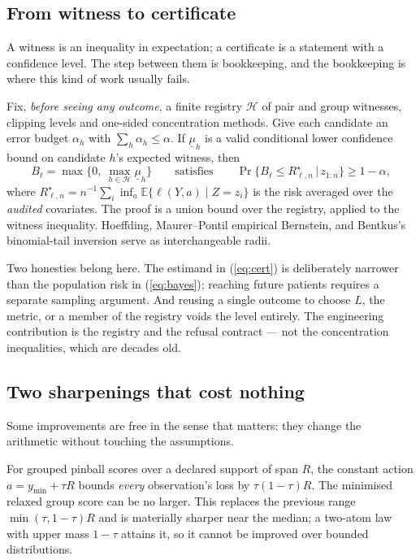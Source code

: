 \documentclass[11pt,a4paper]{article}
\newcommand{\risk}{R^{\star}}
\begin{document}
\subsection{From witness to certificate}

A witness is an inequality in expectation; a certificate is a statement with a confidence level. The step between them is bookkeeping, and the bookkeeping is where this kind of work usually fails.

Fix, \emph{before seeing any outcome}, a finite registry $\mathcal H$ of pair and group witnesses, clipping levels and one-sided concentration methods. Give each candidate an error budget $\alpha_h$ with $\sum_h\alpha_h\leq\alpha$. If $\underline\mu_h$ is a valid conditional lower confidence bound on candidate $h$'s expected witness, then
\begin{equation}
B_\ell=\max\Big\{0,\ \max_{h\in\mathcal H}\underline\mu_h\Big\}
\qquad\text{satisfies}\qquad
\Pr\big\{B_\ell\leq\risk_{\ell,n}\,\big|\,z_{1:n}\big\}\geq 1-\alpha,\label{eq:cert}
\end{equation}
where $\risk_{\ell,n}=n^{-1}\sum_i\inf_a\mathbb E\{\ell(Y,a)\mid Z=z_i\}$ is the risk averaged over the \emph{audited} covariates. The proof is a union bound over the registry, applied to the witness inequality. Hoeffding, Maurer--Pontil empirical Bernstein, and Bentkus's binomial-tail inversion serve as interchangeable radii\cite{hoeffding,maurer,bentkus}.

Two honesties belong here. The estimand in (\ref{eq:cert}) is deliberately narrower than the population risk in (\ref{eq:bayes}); reaching future patients requires a separate sampling argument. And reusing a single outcome to choose $L$, the metric, or a member of the registry voids the level entirely. The engineering contribution is the registry and the refusal contract --- not the concentration inequalities, which are decades old.

\subsection{Two sharpenings that cost nothing}

Some improvements are free in the sense that matters: they change the arithmetic without touching the assumptions.

For grouped pinball scores over a declared support of span $R$, the constant action $a=y_{\min}+\tau R$ bounds \emph{every} observation's loss by $\tau(1-\tau)R$. The minimised relaxed group score can be no larger. This replaces the previous range $\min(\tau,1-\tau)R$ and is materially sharper near the median; a two-atom law with upper mass $1-\tau$ attains it, so it cannot be improved over bounded distributions.
\end{document}
